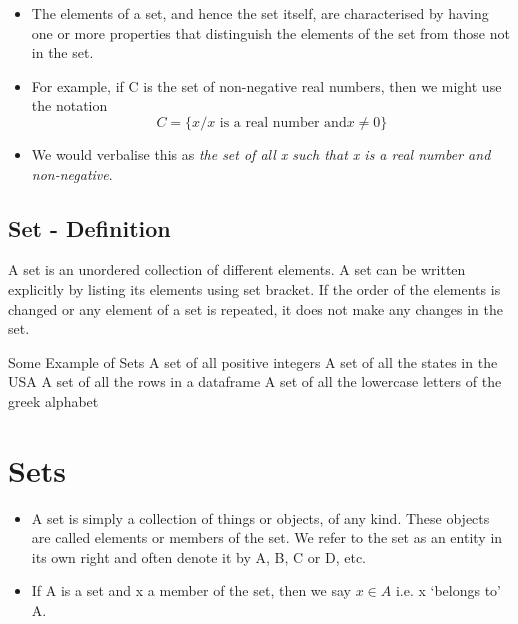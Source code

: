 \documentclass[11pt,a4paper,titlepage,oneside,openany]{article}
\numberwithin{equation}{section}
\numberwithin{algorithm}{section}
\numberwithin{figure}{section}
\numberwithin{table}{section}
\begin{document}
\begin{itemize}
\item The elements of a set, and hence the set itself, are characterised by having
one or more properties that distinguish the elements of the set from those
not in the set. 
\item For example, if C is the set of non-negative real numbers, then we
might use the notation
\[C = \{x / x \mbox{ is a real number and} x \neq 0\}\]
\item We would verbalise this as \textit{the set of all x such that x is a real number and non-negative}.
\end{itemize}


\subsection{Set - Definition}
A set is an unordered collection of different elements. A set can be written explicitly by listing its elements using set bracket. If the order of the elements is changed or any element of a set is repeated, it does not make any changes in the set.

Some Example of Sets
A set of all positive integers
A set of all the states in the USA
A set of all the rows in a dataframe
A set of all the lowercase letters of the greek alphabet\section{Sets}
\smallskip   %

\begin{itemize}
\item A set is simply a collection of things or objects, of any kind. These objects
are called elements or members of the set. We refer to the set as an
entity in its own right and often denote it by A, B, C or D, etc.
\item If A is a set and x a member of the set, then we say $x \in A$ i.e. x ‘belongs to’
A. 
\end{itemize}
\smallskip 
\end{document}
